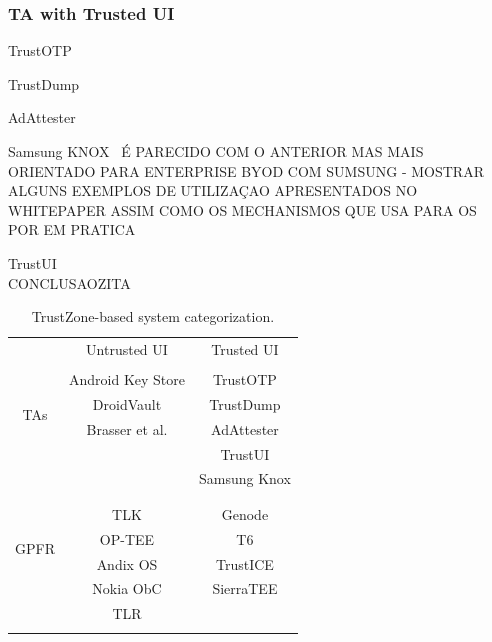 \subsubsection{TA with Trusted UI}

TrustOTP~\cite{sun2015trustotp}

TrustDump~\cite{sun2015reliable}

AdAttester~\cite{li2015adattester}

Samsung KNOX~\cite{knox_whitepaper} É PARECIDO COM O ANTERIOR MAS MAIS ORIENTADO PARA ENTERPRISE BYOD COM SUMSUNG - MOSTRAR ALGUNS EXEMPLOS DE UTILIZAÇAO APRESENTADOS NO WHITEPAPER ASSIM COMO OS MECHANISMOS QUE USA PARA OS POR EM PRATICA

TrustUI~\cite{li2014building}\\

CONCLUSAOZITA
\begin{table}[t!]
	\centering
	\caption{TrustZone-based system categorization.}
	\label{tab:trustzonesystemscomparison}
	\begin{tabular}{ c|c|c| }
		\multicolumn{1}{c}{} 	& \multicolumn{1}{c}{Untrusted UI} 	& \multicolumn{1}{c}{Trusted UI} \\ \cline{2-3}
		\multirow{5}{*}{TAs} 	&									& \\
								& Android Key Store					& TrustOTP \\
								& DroidVault 						& TrustDump \\
								& Brasser et al.					& AdAttester \\
								& 									& TrustUI \\
								&									& Samsung Knox\\
								&									& \\
								\cline{2-3}
		\multirow{5}{*}{GPFR}	&									& \\
								& TLK								& Genode \\
								& OP-TEE 							& T6 \\
								& Andix OS							& TrustICE \\
								& Nokia ObC							& SierraTEE \\
								& TLR 								& \\
								&									& \\
		\cline{2-3}
	\end{tabular}
\end{table}

